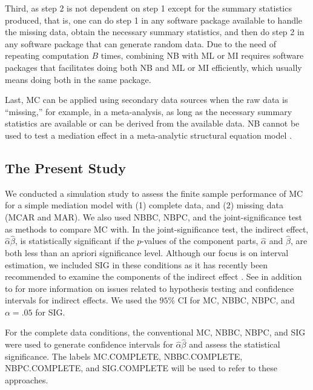 \documentclass[man]{apa7}\usepackage[]{graphicx}\usepackage[]{xcolor}
\begin{document}
Third,
as step 2 is not dependent on step 1 except for the summary statistics produced,
that is,
one can do step 1 in any software package available to handle the missing data,
obtain the necessary summary statistics,
and then do step 2 in any software package that can generate random data.
Due to the need of repeating computation $B$ times,
combining NB with ML or MI requires software packages that facilitates doing both NB and ML or MI efficiently,
which usually means doing both in the same package.

Last,
MC can be applied using secondary data sources when the raw data is ``missing,''
for example,
in a meta-analysis,
as long as the necessary summary statistics are available or can be derived from the available data.
NB cannot be used to test a mediation effect in a meta-analytic structural equation model
\parencite{Lib-Mediation-Meta-Analytic-Structural-Equation-Modeling-Cheung-2021}.

\subsection{The Present Study}

We conducted a simulation study to assess the finite sample performance of MC for a simple mediation model with
(1) complete data, and (2) missing data (MCAR and MAR).
We also used NBBC, NBPC, and the joint-significance test
\parencite[SIG;][]{Lib-Mediation-Joint-Significance-Test-MacKinnon-2002}
as methods to compare MC with.
In the joint-significance test,
the indirect effect,
$\hat{\alpha} \hat{\beta}$,
is statistically significant if the $p$-values of the component parts,
$\hat{\alpha}$ and $\hat{\beta}$,
are both less than an apriori significance level. Although our focus is on interval estimation, we included SIG in these conditions as it has recently been recommended to examine the components of the indirect effect 
\parencite{Lib-Mediation-Joint-Significance-Test-Yzerbyt-2018}.
See
\Textcite{Lib-Mediation-Bootstrap-Biesanz-2010,
Lib-Mediation-Monte-Carlo-Method-Tofighi-2019}
in addition to
\Textcite{Lib-Mediation-Joint-Significance-Test-Yzerbyt-2018}
for more information on
issues related to hypothesis testing and confidence intervals for indirect effects.
We used the $95\%$ CI for MC, NBBC, NBPC, and $\alpha = .05$ for SIG.

For the complete data conditions, the conventional MC, NBBC, NBPC, and SIG were used to generate confidence intervals for $\hat{\alpha} \hat{\beta}$ and assess the statistical significance.
The labels MC.COMPLETE, NBBC.COMPLETE, NBPC.COMPLETE, and SIG.COMPLETE
will be used to refer to these approaches.
\end{document}
